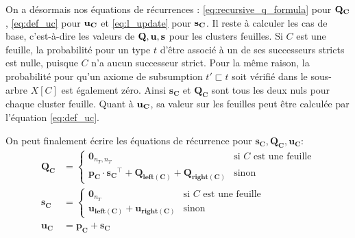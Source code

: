 On a désormais nos équations de récurrences : \ref{eq:recursive_q_formula} pour $\bf{Q_C}$, \ref{eq:def_uc} pour $\bf{u_C}$ et \ref{eq:l_update} pour $\bf{s_C}$. Il reste à calculer les cas de base, c'est-à-dire les valeurs de $\bf{Q, u, s}$ pour les clusters feuilles. Si $C$ est une feuille, la probabilité pour un type $t$ d'être associé à un de ses successeurs stricts est nulle, puisque $C$ n'a aucun successeur strict. Pour la même raison, la probabilité pour qu'un axiome de subsumption $t' \sqsubset t$ soit vérifié dans le sous-arbre $X[C]$ est également zéro. Ainsi $\mathbf{s_C}$ et $\mathbf{Q_C}$ sont tous les deux nuls pour chaque cluster feuille. Quant à $\bf{u_C}$, sa valeur sur les feuilles peut être calculée par l'équation \ref{eq:def_uc}.

On peut finalement écrire les équations de récurrence pour $\mathbf{s_C}, \mathbf{Q_C}, \mathbf{u_C}$:
\begin{align}
    \mathbf{Q_C} &=
    \begin{cases}
      \mathbf{0}_{n_T,n_T} & \text{si $C$ est une feuille}\\
      \mathbf{p_C} \cdot \mathbf{s_C}^\top + \mathbf{Q_\text{left$(C)$}} + \mathbf{Q_\text{right$(C)$}} & \text{sinon}
    \end{cases}  \\
  \mathbf{s_C} &=
    \begin{cases}
      \mathbf{0}_{n_T} & \text{si $C$ est une feuille}\\
      \mathbf{u_\text{left$(C)$}} + \mathbf{u_\text{right$(C)$}} & \text{sinon}
    \end{cases}  \\
    \mathbf{u_C} &= \mathbf{p_C} + \mathbf{s_C}
\end{align}

